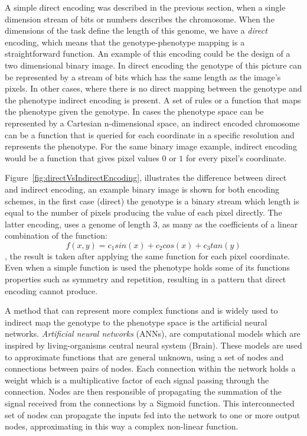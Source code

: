 A simple direct encoding was described in the previous section, when a single dimension stream of bits or numbers describes the chromosome. When the dimensions of the task define the length of this genome, we have a \emph{direct} encoding, which means that the genotype-phenotype mapping is a straightforward function. An example of this encoding could be the design of a two dimensional binary image. In direct encoding the genotype of this picture can be represented by a stream of bits which has the same length as the image's pixels. In other cases, where there is no direct mapping between the genotype and the phenotype indirect encoding is present. A set of rules or a function that maps the phenotype given the genotype. In cases the phenotype space can be represented by a Cartesian n-dimensional space, an indirect encoded chromosome can be a function that is queried for each coordinate in a specific resolution and represents the phenotype. For the same binary image example, indirect encoding would be a function that gives pixel values $0$ or $1$ for every pixel's coordinate. 



Figure~\ref{fig:directVsIndirectEncoding}, illustrates the difference between direct and indirect encoding, an example binary image is shown for both encoding schemes, in the first case (direct) the genotype is a binary stream which length is equal to the number of pixels producing the value of each pixel directly. The latter encoding, uses a genome of length 3, as many as the coefficients of a linear combination of the function: 
\[f(x,y) = c_1 sin(x) + c_2 cos(x) + c_3 tan(y)
\], the result is taken after applying the same function for each pixel coordinate. Even when a simple function is used the  phenotype holds some of its functions properties such as symmetry and repetition, resulting in a pattern that direct encoding cannot produce.

A method that can represent more complex functions and is widely used to indirect map the genotype to the phenotype space is the artificial neural networks. \emph{Artificial neural networks} (ANNs), are computational models which are inspired by living-organisms central neural system (Brain). These models are used to approximate functions that are general unknown, using a set of nodes and connections between pairs of nodes. Each connection within the network holds a weight which is a multiplicative factor of each signal passing through the connection. Nodes are then responsible of propagating the summation of the signal received from the connections by a Sigmoid function. This interconnected set of nodes can propagate the inputs fed into the network to one or more output nodes, approximating in this way a complex non-linear function.


